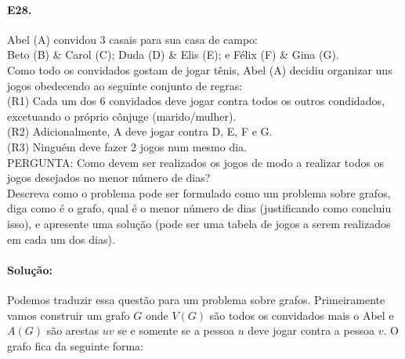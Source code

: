 \documentclass[11pt,a4paper,notitlepage]{exam}
\begin{document}
\paragraph{E28.} Abel (A) convidou 3 casais para sua casa de
campo: \smallskip \\
Beto (B) \& Carol (C); Duda (D) \& Elis (E); e Félix (F) \& Gina (G).
\smallskip\\
Como todo os convidados gostam de jogar tênis, Abel (A) decidiu
organizar uns jogos obedecendo ao seguinte conjunto de regras:\bigskip
\\
(R1) Cada um dos 6 convidados deve jogar contra todos os outros
condidados, excetuando o próprio cônjuge (marido/mulher).\\
(R2) Adicionalmente, A deve jogar contra D, E, F e G.\\
(R3) Ninguém deve fazer 2 jogos num mesmo dia. \bigskip\\ 
PERGUNTA: Como devem ser realizados os jogos de modo a realizar todos os
jogos desejados no menor número de dias?\medskip\\
Descreva como o problema pode ser formulado como um problema sobre
grafos, diga como é o grafo, qual é o menor número de dias
(justificando como concluiu isso), e apresente uma solução (pode
ser uma tabela de jogos a serem realizados em cada um dos dias).
\paragraph{Solução:} 
Podemos traduzir essa questão para um problema sobre grafos.
Primeiramente vamos construir um grafo $G$ onde $V(G)$ são todos os
convidados mais o Abel e $A(G)$ são arestas $uv$ se e somente se a
pessoa $u$ deve jogar contra a pessoa $v$. O grafo fica da seguinte
forma:
 \begin{center} 
  \end{center}
\end{document}

